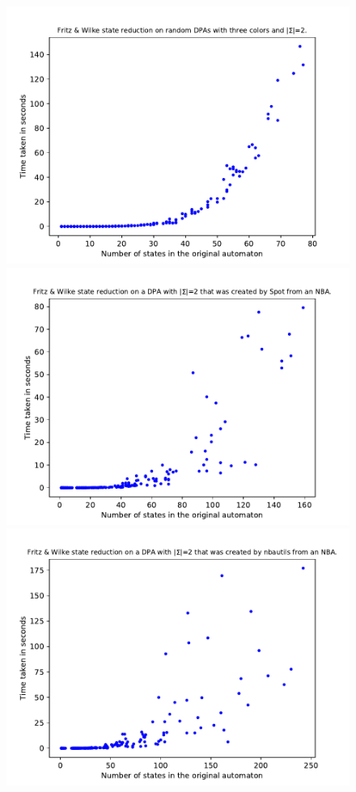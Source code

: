 \begin{figure}
	\centering
	\begin{minipage}{0.49\textwidth}
		\includegraphics[page=6,height=.3\textheight]{../data/analysis/fritzwilke/gendet_ap1.pdf} 
		\includegraphics[page=6,height=.3\textheight]{../data/analysis/fritzwilke/detspot_ap1.pdf} 
		\includegraphics[page=6,height=.3\textheight]{../data/analysis/fritzwilke/detnbaut_ap1.pdf} 

\end{minipage}
\end{figure}
